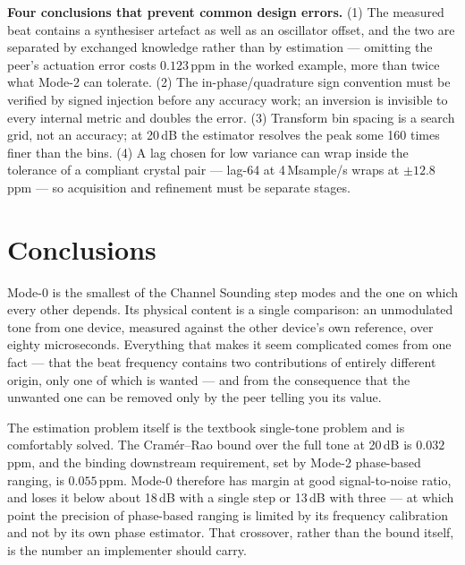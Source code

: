 \documentclass[11pt,a4paper]{article}
\begin{document}
\begin{callout}
\textbf{Four conclusions that prevent common design errors.} (1) The measured beat contains a
synthesiser artefact as well as an oscillator offset, and the two are separated by exchanged
knowledge rather than by estimation --- omitting the peer's actuation error costs $0.123$\,ppm in the
worked example, more than twice what Mode-2 can tolerate. (2) The in-phase/quadrature sign convention
must be verified by signed injection before any accuracy work; an inversion is invisible to every
internal metric and doubles the error. (3) Transform bin spacing is a search grid, not an accuracy;
at 20\,dB the estimator resolves the peak some 160 times finer than the bins. (4) A lag chosen for
low variance can wrap inside the tolerance of a compliant crystal pair --- lag-64 at 4\,Msample/s
wraps at $\pm12.8$\,ppm --- so acquisition and refinement must be separate stages.
\end{callout}

\section{Conclusions}

Mode-0 is the smallest of the Channel Sounding step modes and the one on which every other depends.
Its physical content is a single comparison: an unmodulated tone from one device, measured against
the other device's own reference, over eighty microseconds. Everything that makes it seem complicated
comes from one fact --- that the beat frequency contains two contributions of entirely different
origin, only one of which is wanted --- and from the consequence that the unwanted one can be removed
only by the peer telling you its value.

The estimation problem itself is the textbook single-tone problem and is comfortably solved. The
Cram\'er--Rao bound over the full tone at 20\,dB is $0.032$\,ppm, and the binding downstream
requirement, set by Mode-2 phase-based ranging, is $0.055$\,ppm. Mode-0 therefore has margin at good
signal-to-noise ratio, and loses it below about 18\,dB with a single step or 13\,dB with three ---
at which point the precision of phase-based ranging is limited by its frequency calibration and not
by its own phase estimator. That crossover, rather than the bound itself, is the number an
implementer should carry.
\end{document}

